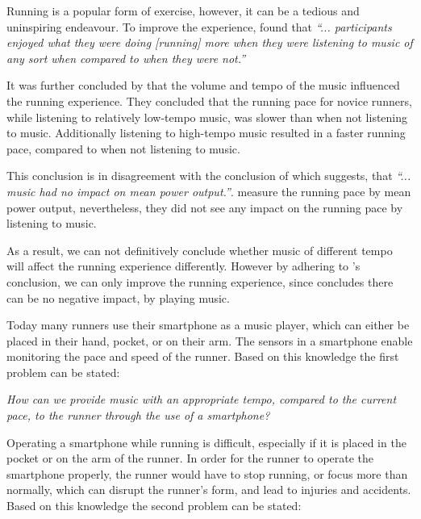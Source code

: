 Running is a popular form of exercise, however, it can be a tedious and uninspiring endeavour.
To improve the experience, \citet{musicRunEffectArticle} found that 
\textit{``... participants enjoyed what they were doing [running] more when they were listening to music of any sort when compared to when they were not.''}

It was further concluded by \citet{musicRunEffectArticle} that the volume and tempo of the music influenced the running experience.
They concluded that the running pace for novice runners, while listening to relatively low-tempo music, was slower than when not listening to music. Additionally listening to high-tempo music resulted in a faster running pace, compared to when not listening to music.

This conclusion is in disagreement with the conclusion of \citet{musicNoPerformanceEffect} which suggests, that \textit{``... music had no impact on mean power output.''}. \citet{musicNoPerformanceEffect} measure the running pace by mean power output, nevertheless, they did not see any impact on the running pace by listening to music.

As a result, we can not definitively conclude whether music of different tempo will affect the running experience differently. 
However by adhering to \citet{musicRunEffectArticle}'s conclusion, we can only improve the running experience, since \citet{musicNoPerformanceEffect} concludes there can be no negative impact, by playing music.

Today many runners use their smartphone as a music player, which can either be placed in their hand, pocket, or on their arm.
The sensors in a smartphone enable monitoring the pace and speed of the runner.
Based on this knowledge the first problem can be stated:

\begin{center}
\textit{How can we provide music with an appropriate tempo, compared to the current pace, to the runner through the use of a smartphone?}
\end{center}

\noindent Operating a smartphone while running is difficult, especially if it is placed in the pocket or on the arm of the runner.
In order for the runner to operate the smartphone properly, the runner would have to stop running, or focus more than normally, which can disrupt the runner's form, and lead to injuries and accidents.
Based on this knowledge the second problem can be stated: 

